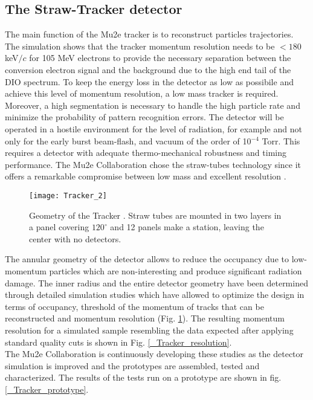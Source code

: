 \documentclass[12pt,a4paper,openright, oneside, titlepage]{book} %
\begin{document}
\subsection{The Straw-Tracker detector}
The main function of the Mu2e tracker is to reconstruct particles trajectories. The simulation shows
that the tracker momentum resolution needs to be $<180$ keV$/c$ for 105 MeV electrons 
to provide the necessary separation between the conversion electron signal 
and the background due to the high end tail of the DIO spectrum. 
To keep the energy loss in the detector
as low as possibile and achieve this level of momentum resolution, 
a low mass tracker is required. Moreover, a high segmentation is necessary to 
handle the high particle rate and minimize the probability of pattern recognition errors.
The detector will be operated in a hostile environment for the level of radiation, for example 
and not only for the early burst beam-flash, and vacuum of the order of 10$^{-4}$ Torr.
This requires a detector with adequate thermo-mechanical robustness and timing performance.
The Mu2e Collaboration chose the straw-tubes technology since it offers a remarkable compromise between low mass and excellent resolution \cite{Tracker:2016} \cite{Tracker:2018}.

\begin{figure}[h!]
\centering
\texttt{[image: Tracker\_2]}
\caption{Geometry of the Tracker \cite{Manolis}. Straw tubes are mounted in two layers in a panel covering $120^\circ$ and 12 panels make a station, leaving the center with no detectors.}
\label{_tracker}
\end{figure}


\noindent
The annular geometry of the detector allows to reduce the occupancy due to low-momentum particles which are non-interesting and produce significant radiation damage.
The inner radius and the entire detector geometry have been determined through detailed 
simulation studies which 
have allowed to optimize the design in terms of occupancy, threshold of the momentum 
of tracks that can be reconstructed and momentum resolution (Fig. \ref{_tracker}).
The resulting momentum resolution for a simulated sample resembling the data expected after applying 
standard quality cuts is shown in Fig. \ref{_Tracker_resolution}.\\
The Mu2e Collaboration is continuously developing these studies as the detector simulation is improved and the prototypes are assembled, tested and characterized. The results of the tests run on a prototype are shown in fig. \ref{_Tracker_prototype}.
\end{document}
